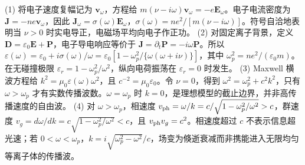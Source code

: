 (1) 将电子速度复幅记为 \(\boldsymbol v_\omega\)，方程给 \(m(\nu-i\omega)\boldsymbol v_\omega=-e\boldsymbol E_\omega\)。电子电流密度为 \(\boldsymbol J=-ne\boldsymbol v_\omega\)，因此 \(\boldsymbol J_\omega=\sigma(\omega)\boldsymbol E_\omega\)，\(\sigma(\omega)=ne^2/[m(\nu-i\omega)]\)。符号自洽地表明当 \(\nu>0\) 时实电导正，电磁场平均向电子作正功。
(2) 对固定离子背景，定义 \(\boldsymbol D=\varepsilon_0\boldsymbol E+\boldsymbol P\)，电子导电响应等价于 \(\boldsymbol J=\partial_t\boldsymbol P=-i\omega\boldsymbol P\)。所以 \(\varepsilon(\omega)=\varepsilon_0+i\sigma(\omega)/\omega=\varepsilon_0[1-\omega_p^2/\{\omega(\omega+i\nu)\}]\)，其中 \(\omega_p^2=ne^2/(\varepsilon_0m)\)。在无碰撞极限 \(\varepsilon_r=1-\omega_p^2/\omega^2\)，纵向电荷振荡在 \(\varepsilon_r=0\) 时发生。
(3) Maxwell 横波方程给 \(k^2=\mu_0\varepsilon(\omega)\omega^2\)，且 \(c^{-2}=\mu_0\varepsilon_0\)。令 \(\nu=0\)，得到 \(\omega^2=\omega_p^2+c^2k^2\)，只有 \(\omega>\omega_p\) 才有实数传播波数。\(\omega=\omega_p\) 时 \(k=0\)，是理想模型的截止边界，并非高传播速度的自由波。
(4) 对 \(\omega>\omega_p\)，相速度 \(v_{\rm ph}=\omega/k=c/\sqrt{1-\omega_p^2/\omega^2}>c\)，群速度 \(v_g=d\omega/dk=c\sqrt{1-\omega_p^2/\omega^2}<c\)，且 \(v_{\rm ph}v_g=c^2\)。相速度超过 \(c\) 不表示信息超光速；若 \(0<\omega<\omega_p\)，\(k=i\sqrt{\omega_p^2-\omega^2}/c\)，场变为倏逝衰减而非携能进入无限均匀等离子体的传播波。
